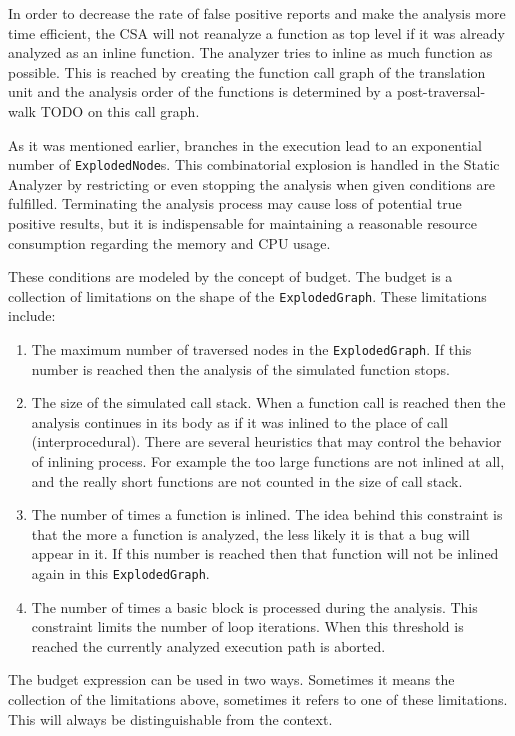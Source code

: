 In order to decrease the rate of false positive reports and make the analysis more time efficient, the CSA will not reanalyze a function as top level if it was already analyzed as an inline function. The analyzer tries to inline as much function as possible. This is reached by creating the function call graph of the translation unit and the analysis order of the functions is determined by a post-traversal-walk TODO on this call graph.

As it was mentioned earlier, branches in the execution lead to an exponential number of \texttt{ExplodedNode}s.
This combinatorial explosion is handled in the Static Analyzer by restricting or even stopping
the analysis when given conditions are fulfilled. Terminating the analysis 
process may cause loss of potential true positive results, but it is 
indispensable for maintaining a reasonable resource consumption regarding the 
memory and CPU usage. 

These conditions are modeled by the concept of budget.
The budget is a collection of limitations on the shape of the \texttt{ExplodedGraph}.
These limitations include:
\begin{enumerate}  
	\item The maximum number of traversed nodes in the \texttt{ExplodedGraph}. 
	If 	this number is reached then the analysis of the simulated function stops.
	\item The size of the simulated call stack. When a function call is 
	reached then the analysis continues in its body as if it was inlined to the 
	place of call (interprocedural). There are several heuristics that may control 
	the	behavior of inlining process. For example the too large functions are 
	not	inlined at all, and the really short functions are not counted in the 
	size of	call stack.
	\item The number of times a function is inlined. The idea behind this
	constraint is that the more a function is analyzed, the less likely it 
	is that a 	bug will appear in it. If this number is reached then that 
	function will not be inlined again in this \texttt{ExplodedGraph}.
	\item The number of times a basic block is processed during the 
	analysis. This	constraint limits the number of loop iterations. When this 
	threshold is reached the currently analyzed execution path is aborted.
\end{enumerate}

The budget expression can be used in two ways. Sometimes it means the
collection of the limitations above, sometimes it refers to one of these
limitations. This will always be distinguishable from the context.

